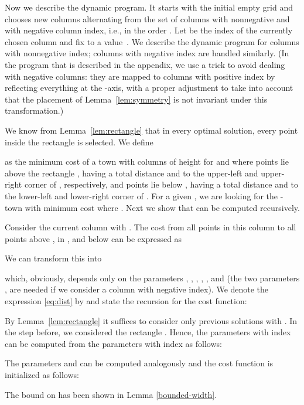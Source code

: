 \documentclass[preprint,authoryear,12pt]{elsarticle}
\begin{document}
Now we describe the dynamic program. It starts with the initial
empty grid and chooses new columns alternating from the set of
columns with nonnegative and with negative column index, i.e.,
in the order
. Let  be the index of the currently
chosen column and fix  to a value~. We describe the dynamic
program for columns with nonnegative index; columns with negative
index are handled similarly.
(In the program that is described in the appendix, we use a trick to
avoid dealing with negative columns: they are mapped to columns with positive
index by reflecting everything at the -axis, with a proper
adjustment to take into account that the placement of
Lemma~\ref{lem:symmetry} is not invariant under this transformation.)


We know from Lemma~\ref{lem:rectangle} that in every optimal
solution, every point inside the rectangle  is selected.
We define

as the minimum cost of a town
with columns  of height  for 
and  where  points lie above the rectangle , having
a total distance  and
 to the upper-left and upper-right corner of
, respectively, and  points lie below , having a
total distance  and 
to the lower-left and lower-right corner of . For a given ,
we are looking for the -town with minimum cost where . Next we show that
 can be
computed recursively.

Consider the current column  with . The cost from all
points in this column to all points above , in , and below
 can be expressed as

We can transform this into

which, obviously, depends only on the parameters , ,
, , , and
 (the two parameters ,
 are needed if we consider a column with
negative index). We denote the expression \eqref{eq:dist} by  and
state the recursion for the cost function:

By Lemma~\ref{lem:rectangle} it suffices to consider only previous
solutions with . In the step before, we considered the
rectangle . Hence, the
parameters with index  can be computed from the parameters with
index  as follows:

The parameters  and
 can be computed analogously and the cost
function is initialized as follows:

The bound on  has been shown in Lemma \ref{bounded-width}.
\end{document}
